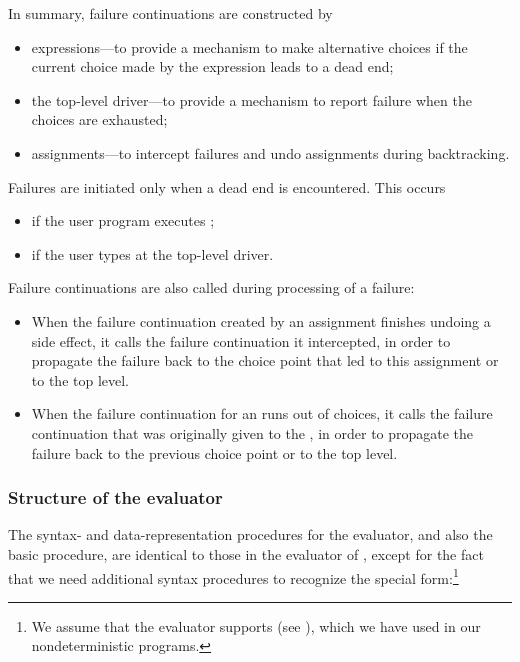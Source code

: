 In summary, failure continuations are constructed by

\begin{itemize}
\item
{} expressions---to provide a mechanism to make alternative choices if
the current choice made by the  expression leads to a dead end;

\item
the top-level driver---to provide a mechanism to report failure when the
choices are exhausted;

\item
assignments---to intercept failures and undo assignments during backtracking.
\end{itemize}

\noindent
Failures are initiated only when a dead end is encountered.  This occurs

\begin{itemize}
\item
if the user program executes ;

\item
if the user types  at the top-level driver.
\end{itemize}

\noindent
Failure continuations are also called during processing of a failure:

\begin{itemize}
\item
When the failure continuation created by an assignment finishes undoing a side
effect, it calls the failure continuation it intercepted, in order to propagate
the failure back to the choice point that led to this assignment or to the top
level.

\item
When the failure continuation for an  runs out of choices, it calls
the failure continuation that was originally given to the , in order
to propagate the failure back to the previous choice point or to the top level.
\end{itemize}

\subsubsection*{Structure of the evaluator}

The syntax- and data-representation procedures for the  evaluator,
and also the basic  procedure, are identical to those in the
evaluator of , except for the fact that we need additional
syntax procedures to recognize the  special form:\footnote{We assume
that the evaluator supports  (see ), which we have
used in our nondeterministic programs.}

